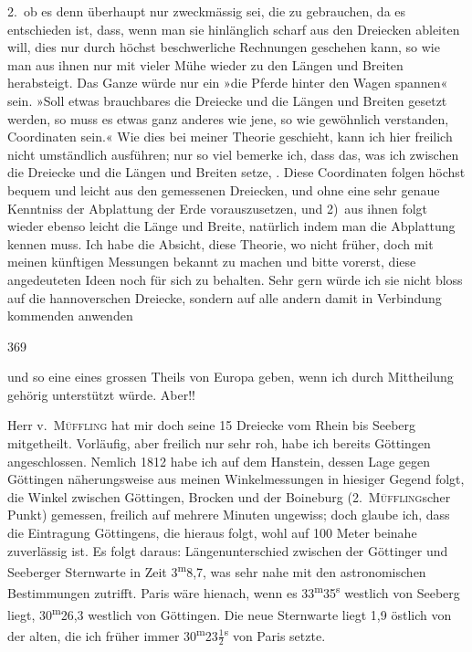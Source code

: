 \par\noindent\hspace*{\parindent}2.\ ob es denn überhaupt nur zweckmässig sei, die  zu gebrauchen, da es entschieden ist, dass, wenn man sie hinlänglich scharf aus den Dreiecken ableiten will, dies nur durch höchst beschwerliche Rechnungen geschehen kann, so wie man aus ihnen nur mit vieler Mühe wieder zu den Längen und Breiten herabsteigt.
Das Ganze würde nur ein »die Pferde hinter den Wagen spannen« sein.
»Soll etwas brauchbares  die Dreiecke und die Längen und Breiten gesetzt werden, so muss es etwas ganz anderes wie jene, so wie gewöhnlich verstanden, Coordinaten sein.«
Wie dies bei meiner Theorie geschieht, kann ich hier freilich nicht umständlich ausführen; nur so viel bemerke ich, dass das, was ich zwischen die Dreiecke und die Längen und Breiten setze, .
Diese Coordinaten folgen höchst bequem und leicht aus den gemessenen Dreiecken, und ohne eine sehr genaue Kenntniss der Abplattung der Erde vorauszusetzen, und 2)~aus ihnen folgt wieder ebenso leicht die Länge und Breite, natürlich indem man die Abplattung kennen muss.
Ich habe die Absicht, diese Theorie, wo nicht früher, doch mit meinen künftigen Messungen bekannt zu machen und bitte vorerst, diese angedeuteten Ideen noch für sich zu behalten.
Sehr gern würde ich sie nicht bloss auf die hannoverschen Dreiecke, sondern auf alle andern damit in Verbindung kommenden anwenden
\par\clearpage
{}\hfill369\par\medskip
\noindent und so eine  eines grossen Theils von Europa geben, wenn ich durch Mittheilung gehörig unterstützt würde.
Aber!!

\par\noindent\hspace*{\parindent}Herr v.\ \textsc{Müffling} hat mir doch seine 15 Dreiecke vom Rhein bis Seeberg mitgetheilt.
Vorläufig, aber freilich nur sehr roh, habe ich bereits Göttingen angeschlossen.
Nemlich 1812 habe ich auf dem Hanstein, dessen Lage gegen Göttingen näherungsweise aus meinen Winkelmessungen in hiesiger Gegend folgt, die Winkel zwischen Göttingen, Brocken und der Boineburg (2.~\textsc{Müffling}scher Punkt) gemessen, freilich auf mehrere Minuten ungewiss; doch glaube ich, dass die Eintragung Göttingens, die hieraus folgt, wohl auf 100 Meter beinahe zuverlässig ist.
Es folgt daraus: Längenunterschied zwischen der Göttinger und Seeberger Sternwarte in Zeit \mbox{3\textsuperscript{m}8,7}, was sehr nahe mit den astronomischen Bestimmungen zutrifft.
Paris wäre hienach, wenn es \mbox{33\textsuperscript{m}35\textsuperscript{s}} westlich von Seeberg liegt, \mbox{30\textsuperscript{m}26,3} westlich von Göttingen.
Die neue Sternwarte liegt \mbox{1,9} östlich von der alten, die ich früher immer \mbox{30\textsuperscript{m}23\(\tfrac{1}{2}\)\textsuperscript{s}} von Paris setzte.
